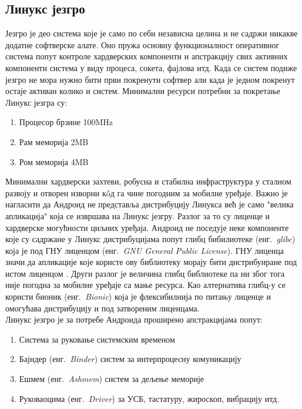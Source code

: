 \documentclass[12pt,oneside]{memoir}
\theoremstyle{remark}
\begin{document}
\subsection{Линукс језгро}
Језгро је део система које је само по себи независна целина и не садржи никакве додатне софтверске алате.  Оно пружа основну функционалност оперативног система попут контроле хардверских компоненти и апстракцију свих активних компоненти система у виду процеса, сокета, фајлова итд. Када се систем подиже језгро не мора нужно бити први покренути софтвер али када је једном покренут остаје активан колико и систем. Минимални ресурси потребни за покретање Линукс језгра су:
\begin{enumerate}
\item Процесор брзине 100MHz
\item Рам меморија 2MB
\item Ром меморија 4MB
\end{enumerate}
Минимални хардверски захтеви, робусна и стабилна инфраструктура у сталном развоју и отворен изворни к\^{o}д га чине погодним за мобилне уређаје. Важно је нагласити да Андроид не представља дистрибуцију Линукса већ је само "велика апликација" која се извршава на Линукс језгру. Разлог за то су лиценце и хардверске могућности циљних уређаја. Андроид не поседује неке компоненте које су садржане у Линукс дистрибуцијама попут глибц бибилиотеке (енг.~{\em glibc}) која је под ГНУ лиценцом  (енг.~{\em GNU General Public License}). ГНУ лиценца значи да апликације које користе ову библиотеку морају бити дистрибуиране под истом лиценцом \cite{gnulicence}. Други разлог је величина глибц библиотеке па ни због тога није погодна за мобилне уређаје са мање ресурса. Као алтернатива глибц-у се користи бионик (енг.~{\em Bionic}) која је флексибилнија по питању лиценце и омогућава дистрибуцију и под затвореним лиценцама.\\
Линукс језгро је за потребе Андроида проширено апстракцијама попут:

\begin{enumerate}
\item Система за руковање системским временом
\item Бајндер (енг.~{\em Binder}) систем за интерпроцесну комуникацију
\item Ешмем (енг.~{\em Ashmem}) систем за дељење меморије
\item Руковаоцима (енг.~{\em Driver}) за УСБ, тастатуру, жироскоп, вибрацију итд.
\end{enumerate}
\end{document}
